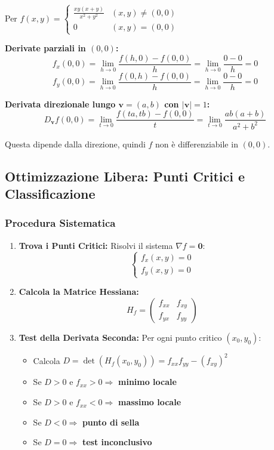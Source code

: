 \begin{esempio}
Per $f(x,y) = \begin{cases}\frac{xy(x+y)}{x^{2}+y^{2}} & (x,y)\ne(0,0)\\ 0 & (x,y)=(0,0)\end{cases}$

\textbf{Derivate parziali in $(0,0)$:}
\[ f_x(0,0) = \lim_{h \to 0} \frac{f(h,0) - f(0,0)}{h} = \lim_{h \to 0} \frac{0 - 0}{h} = 0 \]
\[ f_y(0,0) = \lim_{h \to 0} \frac{f(0,h) - f(0,0)}{h} = \lim_{h \to 0} \frac{0 - 0}{h} = 0 \]

\textbf{Derivata direzionale lungo $\mathbf{v} = (a,b)$ con $|\mathbf{v}| = 1$:}
\[ D_{\mathbf{v}}f(0,0) = \lim_{t \to 0} \frac{f(ta,tb) - f(0,0)}{t} = \lim_{t \to 0} \frac{ab(a+b)}{a^2+b^2} \]

Questa dipende dalla direzione, quindi $f$ non è differenziabile in $(0,0)$.
\end{esempio}

\subsection{Ottimizzazione Libera: Punti Critici e Classificazione}

\subsubsection{Procedura Sistematica}
\begin{enumerate}
    \item \textbf{Trova i Punti Critici:} Risolvi il sistema $\nabla f = \mathbf{0}$:
    \[ \begin{cases} f_x(x,y) = 0 \\ f_y(x,y) = 0 \end{cases} \]
    
    \item \textbf{Calcola la Matrice Hessiana:}
    \[ H_f = \begin{pmatrix} f_{xx} & f_{xy} \\ f_{yx} & f_{yy} \end{pmatrix} \]
    
    \item \textbf{Test della Derivata Seconda:} Per ogni punto critico $(x_0,y_0)$:
    \begin{itemize}
        \item Calcola $D = \det(H_f(x_0,y_0)) = f_{xx}f_{yy} - (f_{xy})^2$
        \item Se $D > 0$ e $f_{xx} > 0 \Rightarrow$ \textbf{minimo locale}
        \item Se $D > 0$ e $f_{xx} < 0 \Rightarrow$ \textbf{massimo locale}
        \item Se $D < 0 \Rightarrow$ \textbf{punto di sella}
        \item Se $D = 0 \Rightarrow$ \textbf{test inconclusivo}
    \end{itemize}
\end{enumerate}

